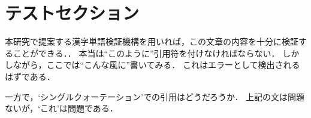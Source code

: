 \section{テストセクション}

本研究で提案する漢字単語検証機構を用いれば，この文章の内容を十分に検証することができる．．
本当は``このように''引用符を付けなければならない．
しかしながら，ここでは“こんな風に”書いてみる．
これはエラーとして検出されるはずである．

一方で，`シングルクォーテーション'での引用はどうだろうか．
上記の文は問題ないが，‘これ’は問題である．

